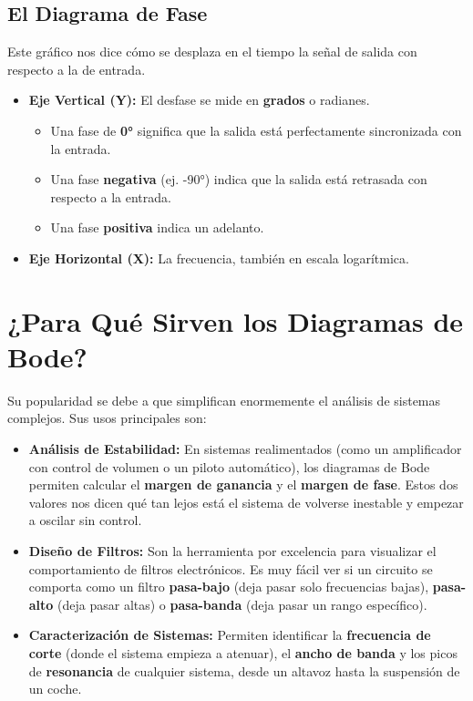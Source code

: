 \documentclass[12pt, a4paper]{article}
\begin{document}
\subsection{El Diagrama de Fase}
Este gráfico nos dice cómo se desplaza en el tiempo la señal de salida con respecto a la de entrada.
\begin{itemize}
    \item \textbf{Eje Vertical (Y):} El desfase se mide en \textbf{grados} o radianes.
    \begin{itemize}
        \item Una fase de \textbf{0°} significa que la salida está perfectamente sincronizada con la entrada.
        \item Una fase \textbf{negativa} (ej. -90°) indica que la salida está retrasada con respecto a la entrada.
        \item Una fase \textbf{positiva} indica un adelanto.
    \end{itemize}
    \item \textbf{Eje Horizontal (X):} La frecuencia, también en escala logarítmica.
\end{itemize}

\section{¿Para Qué Sirven los Diagramas de Bode?}
Su popularidad se debe a que simplifican enormemente el análisis de sistemas complejos. Sus usos principales son:

\begin{itemize}
    \item \textbf{Análisis de Estabilidad:} En sistemas realimentados (como un amplificador con control de volumen o un piloto automático), los diagramas de Bode permiten calcular el \textbf{margen de ganancia} y el \textbf{margen de fase}. Estos dos valores nos dicen qué tan lejos está el sistema de volverse inestable y empezar a oscilar sin control.
    
    \item \textbf{Diseño de Filtros:} Son la herramienta por excelencia para visualizar el comportamiento de filtros electrónicos. Es muy fácil ver si un circuito se comporta como un filtro \textbf{pasa-bajo} (deja pasar solo frecuencias bajas), \textbf{pasa-alto} (deja pasar altas) o \textbf{pasa-banda} (deja pasar un rango específico).
    
    \item \textbf{Caracterización de Sistemas:} Permiten identificar la \textbf{frecuencia de corte} (donde el sistema empieza a atenuar), el \textbf{ancho de banda} y los picos de \textbf{resonancia} de cualquier sistema, desde un altavoz hasta la suspensión de un coche.
\end{itemize}
\end{document}
